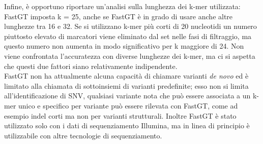 \documentclass[../main.tex]{subfiles}
\begin{document}
Infine, è opportuno riportare un'analisi sulla lunghezza dei k-mer utilizzata: FastGT imposta k = 25, anche se FastGT è in grado di usare anche altre lunghezze tra 16 e 32. Se si utilizzano k-mer più corti di 20 nucleotidi un numero piuttosto elevato di marcatori viene eliminato dal set nelle fasi di filtraggio, ma questo numero non aumenta in modo significativo per k maggiore di 24. Non viene confrontata l'accuratezza con diverse lunghezze dei k-mer, ma ci si aspetta che questi due fattori siano relativamente indipendente. \\

FastGT non ha attualmente alcuna capacità di chiamare varianti \textit{de novo} ed è limitato alla chiamata di sottoinsiemi di varianti predefinite; esso non si limita all'identificazione di SNV, qualsiasi variante nota che può essere associata a un k-mer unico e specifico per variante può essere rilevata con FastGT, come ad esempio indel corti ma non per varianti strutturali. Inoltre FastGT è stato utilizzato solo con i dati di sequenziamento Illumina, ma in linea di principio è utilizzabile con altre tecnologie di sequenziamento.
\end{document}
